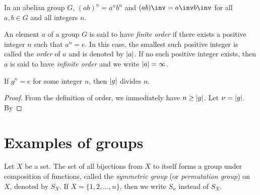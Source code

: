 \begin{theorem}
    In an abelian group \(G\), \((ab)^n = a^n b^n\) and \((ab)\inv = a\inv
    b\inv\) for all \(a, b \in G\) and all integers \(n\).
\end{theorem}

\begin{definition}
    An element \(a\) of a group \(G\) is said to have \emph{finite order} if
    there exists a positive integer \(n\) such that \(a^n = e\). In this case,
    the smallest such positive integer is called the \emph{order} of \(a\) and
    is denoted by \(\lvert a \rvert\). If no such positive integer exists, then \(a\)
    is said to have \emph{infinite order} and we write \(\lvert a \rvert = \infty\).
\end{definition}

\begin{theorem}
    If \(g^n = e\) for some integer \(n\), then \(\lvert g \rvert\) divides \(n\).
\end{theorem}

\begin{proof}
    From the definition of order, we immediately have \(n \geq \lvert g \rvert\). Let
    \(\nu = \lvert g \rvert\). By 
\end{proof}


\section{Examples of groups}

\begin{definition}
    Let \(X\) be a set. The set of all bijections from \(X\) to itself forms a
    group under composition of functions, called the \emph{symmetric group} (or
    \emph{permutation group}) on \(X\), denoted by \(S_X\). If \(X = \{1, 2,
    \ldots, n\}\), then we write \(S_n\) instead of \(S_X\).
\end{definition}

